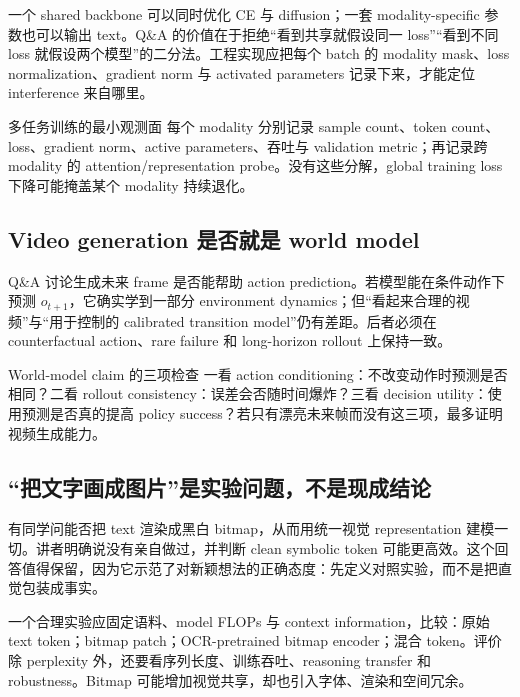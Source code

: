 一个 shared backbone 可以同时优化 CE 与 diffusion；一套 modality-specific 参数也可以输出 text。Q\&A 的价值在于拒绝“看到共享就假设同一 loss”“看到不同 loss 就假设两个模型”的二分法。工程实现应把每个 batch 的 modality mask、loss normalization、gradient norm 与 activated parameters 记录下来，才能定位 interference 来自哪里。

\begin{importantbox}{多任务训练的最小观测面}
每个 modality 分别记录 sample count、token count、loss、gradient norm、active parameters、吞吐与 validation metric；再记录跨 modality 的 attention/representation probe。没有这些分解，global training loss 下降可能掩盖某个 modality 持续退化。
\end{importantbox}

\subsection{Video generation 是否就是 world model}

Q\&A 讨论生成未来 frame 是否能帮助 action prediction。若模型能在条件动作下预测 $o_{t+1}$，它确实学到一部分 environment dynamics；但“看起来合理的视频”与“用于控制的 calibrated transition model”仍有差距。后者必须在 counterfactual action、rare failure 和 long-horizon rollout 上保持一致。


\begin{warningbox}{World-model claim 的三项检查}
一看 action conditioning：不改变动作时预测是否相同？二看 rollout consistency：误差会否随时间爆炸？三看 decision utility：使用预测是否真的提高 policy success？若只有漂亮未来帧而没有这三项，最多证明视频生成能力。
\end{warningbox}

\subsection{“把文字画成图片”是实验问题，不是现成结论}

有同学问能否把 text 渲染成黑白 bitmap，从而用统一视觉 representation 建模一切。讲者明确说没有亲自做过，并判断 clean symbolic token 可能更高效。这个回答值得保留，因为它示范了对新颖想法的正确态度：先定义对照实验，而不是把直觉包装成事实。

一个合理实验应固定语料、model FLOPs 与 context information，比较：原始 text token；bitmap patch；OCR-pretrained bitmap encoder；混合 token。评价除 perplexity 外，还要看序列长度、训练吞吐、reasoning transfer 和 robustness。Bitmap 可能增加视觉共享，却也引入字体、渲染和空间冗余。

